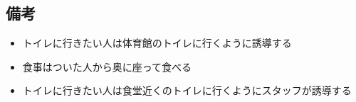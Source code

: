 \subsection{備考}
\begin{itemize}
  \item トイレに行きたい人は体育館のトイレに行くように誘導する
  \item 食事はついた人から奥に座って食べる
  \item トイレに行きたい人は食堂近くのトイレに行くようにスタッフが誘導する
\end{itemize}




%
